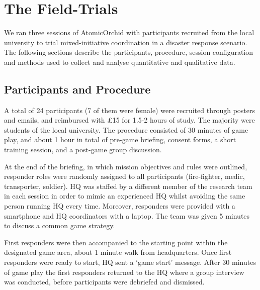 \section{The Field-Trials}\label{sec:evaluation}
\noindent We ran three sessions of AtomicOrchid with participants recruited from the local university to trial mixed-initiative coordination in a disaster response scenario. The following sections describe the participants, procedure, session configuration and methods used to collect and analyse quantitative and qualitative data.

\subsection{Participants and Procedure}
\noindent  A total of 24 participants (7 of them were female) were recruited through posters and emails, and reimbursed with \pounds 15  for 1.5-2 hours of study. The majority were students of the local university. The procedure consisted of 30 minutes of game play, and about 1 hour in total of pre-game briefing, consent forms,  a short training session, and a post-game group discussion. 


At the end of the briefing, in which mission objectives and rules were outlined, responder roles were randomly assigned to all participants (fire-fighter, medic, transporter, soldier). HQ was staffed by a different member of the research team in each session in order to mimic an experienced HQ whilst avoiding the same person running HQ every time.  Moreover, responders were provided with a smartphone and HQ coordinators with a laptop. The team was given 5 minutes to discuss a common game strategy. 


First responders were then accompanied to the starting point within the designated game area, about 1 minute walk from headquarters. Once first responders were ready to start, HQ sent a `game start' message. After 30 minutes of game play the first responders returned to the HQ where a group interview was conducted, before participants were debriefed and dismissed.

